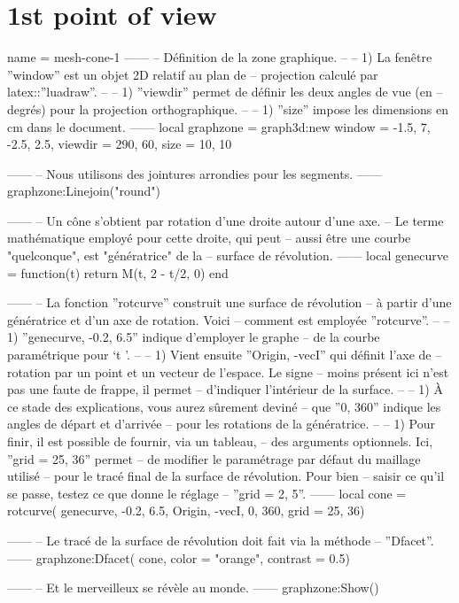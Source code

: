 \documentclass[varwidth, border = 3pt]{standalone}
\begin{document}
\section*{1st point of view}

\begin{luadraw}{name = mesh-cone-1}
------
-- Définition de la zone graphique.
--
--     1) La fenêtre ''window'' est un objet 2D relatif au plan de
--     projection calculé par latex::''luadraw''.
--
--     1) ''viewdir'' permet de définir les deux angles de vue (en
--     degrés) pour la projection orthographique.
--
--     1) ''size'' impose les dimensions en cm dans le document.
------
    local graphzone = graph3d:new{
        window  = {-1.5, 7, -2.5, 2.5},
        viewdir = {290, 60},
        size    = {10, 10}
    }

------
-- Nous utilisons des jointures arrondies pour les segments.
------
    graphzone:Linejoin("round")

------
-- Un cône s'obtient par rotation d'une droite autour d'une axe.
-- Le terme mathématique employé pour cette droite, qui peut
-- aussi être une courbe "quelconque", est "génératrice" de la
-- surface de révolution.
------
    local genecurve = function(t)
        return M(t, 2 - t/2, 0)
    end

------
-- La fonction ''rotcurve'' construit une surface de révolution
-- à partir d'une génératrice et d'un axe de rotation. Voici
-- comment est employée ''rotcurve''.
--
--     1) ''genecurve, -0.2, 6.5'' indique d'employer le graphe
--     de la courbe paramétrique pour `t \in [-0.2 .. 6.5]'.
--
--     1) Vient ensuite ''{Origin, -vecI}'' qui définit l'axe de
--     rotation par un point et un vecteur de l'espace. Le signe
--     moins présent ici n'est pas une faute de frappe, il permet
--     d'indiquer l'intérieur de la surface.
--
--     1) À ce stade des explications, vous aurez sûrement deviné
--     que ''0, 360'' indique les angles de départ et d'arrivée
--     pour les rotations de la génératrice.
--
--     1) Pour finir, il est possible de fournir, via un tableau,
--     des arguments optionnels. Ici, ''grid = {25, 36}'' permet
--     de modifier le paramétrage par défaut du maillage utilisé
--     pour le tracé final de la surface de révolution. Pour bien
--     saisir ce qu'il se passe, testez ce que donne le réglage
--     ''grid = {2, 5}''.
------
    local cone = rotcurve(
        genecurve, -0.2, 6.5,
        {Origin, -vecI},
        0, 360,
        {grid = {25, 36}})

------
-- Le tracé de la surface de révolution doit fait via la méthode
-- ''Dfacet''.
------
    graphzone:Dfacet(
        cone,
        {color    = "orange",
         contrast = 0.5})

------
-- Et le merveilleux se révèle au monde.
------
    graphzone:Show()
\end{luadraw}
\end{document}
